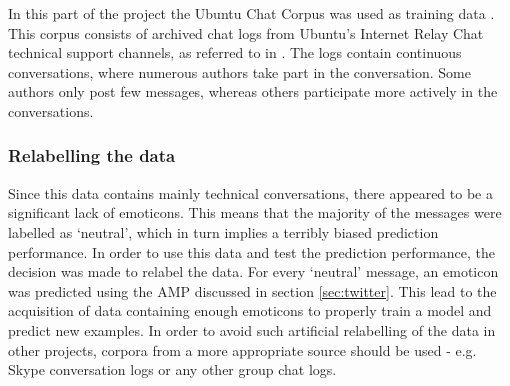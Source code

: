 In this part of the project the Ubuntu Chat Corpus was used as training data \cite{ubuntudata}. This corpus consists of archived chat logs from Ubuntu's Internet Relay Chat technical support channels, as referred to in \cite{ubuntudata}. The logs contain continuous conversations, where numerous authors take part in the conversation. Some authors only post few messages, whereas others participate more actively in the conversations. 

\subsubsection*{Relabelling the data} 
Since this data contains mainly technical conversations, there appeared to be a significant lack of emoticons. This means that the majority of the messages were labelled as `neutral', which in turn implies a terribly biased prediction performance. In order to use this data and test the prediction performance, the decision was made to relabel the data. For every `neutral' message, an emoticon was predicted using the AMP discussed in section \ref{sec:twitter}. This lead to the acquisition of data containing enough emoticons to properly train a model and predict new examples. In order to avoid such artificial relabelling of the data in other projects, corpora from a more appropriate source should be used - e.g. Skype conversation logs or any other group chat logs.
